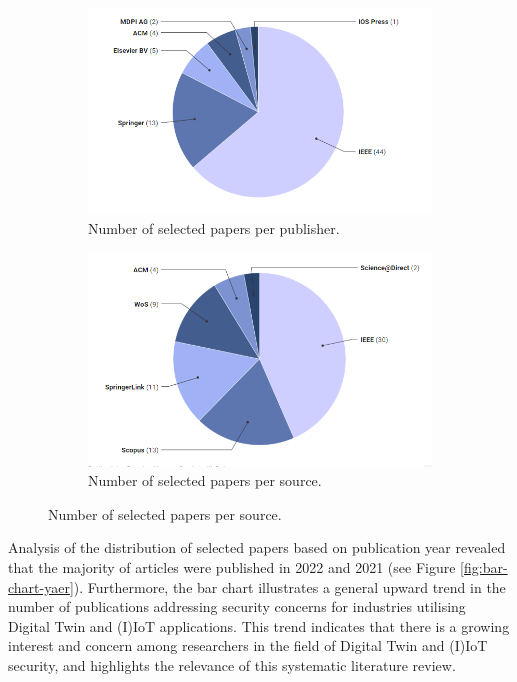 \begin{figure}[H]    
    \caption{An Analysis of Paper Distribution Based on Source and Publisher.}
    \begin{subfigure}[b]{0.45\textwidth}
    \caption{Number of selected papers per publisher.}
        \includegraphics[width=\textwidth]{images/newimages/publisher-per-paper-screenshot.png}
    \end{subfigure}
    \begin{subfigure}[b]{0.45\textwidth}
    \caption{Number of selected papers per source.}
        \includegraphics[width=\textwidth]{images/newimages/source-paper-screenshot.png}
    \end{subfigure}
    \label{fig:archive-itemtype}
\end{figure}
 
Analysis of the distribution of selected papers based on publication year revealed that the majority of articles were published in 2022 and 2021 (see Figure \ref{fig:bar-chart-yaer}). Furthermore, the bar chart illustrates a general upward trend in the number of publications addressing security concerns for industries utilising Digital Twin and (I)IoT applications. This trend indicates that there is a growing interest and concern among researchers in the field of Digital Twin and (I)IoT security, and highlights the relevance of this systematic literature review.

